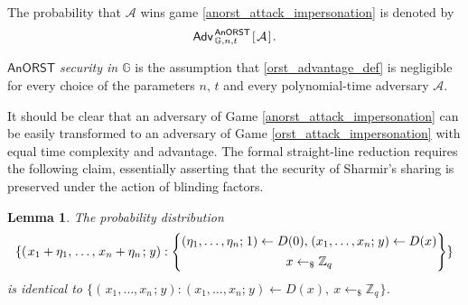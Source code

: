 \documentclass[psamsfonts, reqno]{amsart}
\newtheorem{lem}[thm]{Lemma}
\theoremstyle{definition}
\theoremstyle{remark}
\numberwithin{equation}{section}
\begin{document}
\noindent
The probability that $\mathcal{A}$
wins game \eqref{anorst_attack_impersonation}
is denoted by
\vspace{5pt}
\begin{equation}\label{anorst_advantage_def}
\mathsf{Adv}
	_{\hspace{1pt}\mathbb{G},\hspace{0pt} n,\hspace{0pt} t}
	^{\hspace{1pt}\mathsf{AnORST}}
	\hspace{1pt}
		[\hspace{1pt}
			\mathcal{A}
		\hspace{1pt}]\hspace{1pt}.
\vspace{5pt}
\end{equation}

\noindent
$\mathsf{AnORST}$ \textit{security in $\mathbb{G}$}
is the assumption that \eqref{orst_advantage_def}
is negligible for every choice of the parameters
$n,\hspace{2pt} t$ and every polynomial-time adversary $\mathcal{A}$.

It should be clear that an adversary of Game
\ref{anorst_attack_impersonation}
can be easily transformed to an adversary of Game
\ref{orst_attack_impersonation}
with equal time complexity and advantage.
The formal straight-line reduction requires the following
claim, essentially asserting
that the security of Sharmir's sharing is preserved
under the action of blinding factors.

\begin{lem}\label{rotation_indistinguishability}
The probability distribution
\vspace{5pt}
\begin{equation*}
\{(
	\hspace{1pt}
	x_1 + \eta_1,
	\hspace{1pt}
	\dots,
	\hspace{1pt}
	x_n + \eta_n
	\hspace{1pt};
	\hspace{1pt} y
	):
\begin{Bmatrix}
\hspace{0pt}(\eta_1, \dots, \eta_n;\hspace{1pt} 1) \leftarrow D(0),
\hspace{1pt} \hspace{0pt}(x_1, \dots, x_n;\hspace{1pt} y) \leftarrow D(x)\\[4pt]
x \leftarrow_\$ \mathbb{Z}_q
\end{Bmatrix}
\}
\vspace{5pt}
\end{equation*}
is identical to
$
\{(\hspace{1pt}x_1, \dots, x_n\hspace{1pt};\hspace{1pt} y):
(x_1, \dots, x_n;\hspace{1pt} y) \leftarrow D(x),
\ x \leftarrow_\$ \mathbb{Z}_q
\hspace{1pt}
\}
$.
\end{lem}
\end{document}
